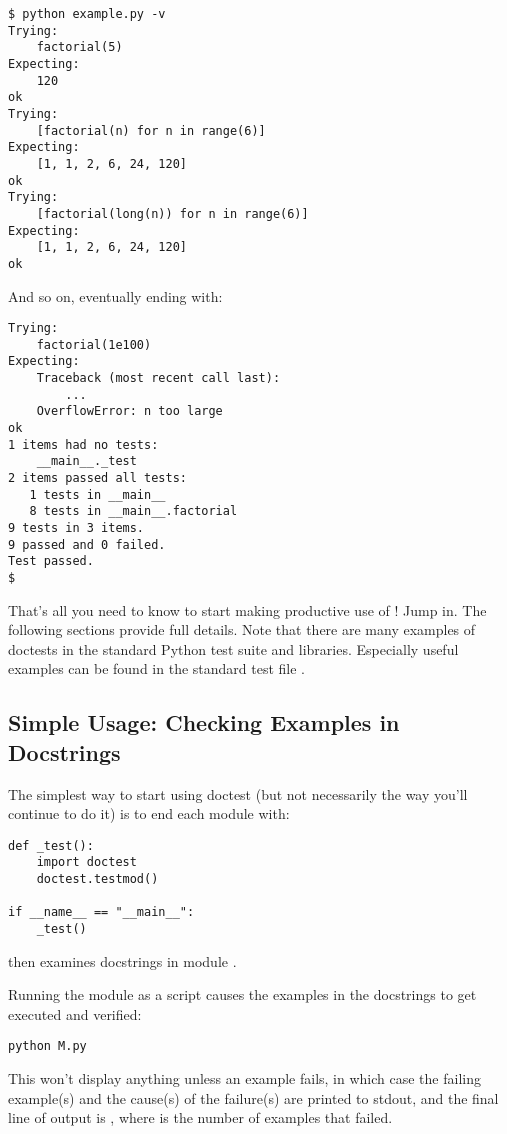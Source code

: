\begin{verbatim}
$ python example.py -v
Trying:
    factorial(5)
Expecting:
    120
ok
Trying:
    [factorial(n) for n in range(6)]
Expecting:
    [1, 1, 2, 6, 24, 120]
ok
Trying:
    [factorial(long(n)) for n in range(6)]
Expecting:
    [1, 1, 2, 6, 24, 120]
ok
\end{verbatim}

And so on, eventually ending with:

\begin{verbatim}
Trying:
    factorial(1e100)
Expecting:
    Traceback (most recent call last):
        ...
    OverflowError: n too large
ok
1 items had no tests:
    __main__._test
2 items passed all tests:
   1 tests in __main__
   8 tests in __main__.factorial
9 tests in 3 items.
9 passed and 0 failed.
Test passed.
$
\end{verbatim}

That's all you need to know to start making productive use of
!  Jump in.  The following sections provide full
details.  Note that there are many examples of doctests in
the standard Python test suite and libraries.  Especially useful examples
can be found in the standard test file .

\subsection{Simple Usage: Checking Examples in
            Docstrings\label{doctest-simple-testmod}}

The simplest way to start using doctest (but not necessarily the way
you'll continue to do it) is to end each module  with:

\begin{verbatim}
def _test():
    import doctest
    doctest.testmod()

if __name__ == "__main__":
    _test()
\end{verbatim}

 then examines docstrings in module .

Running the module as a script causes the examples in the docstrings
to get executed and verified:

\begin{verbatim}
python M.py
\end{verbatim}

This won't display anything unless an example fails, in which case the
failing example(s) and the cause(s) of the failure(s) are printed to stdout,
and the final line of output is
, where  is the
number of examples that failed.

